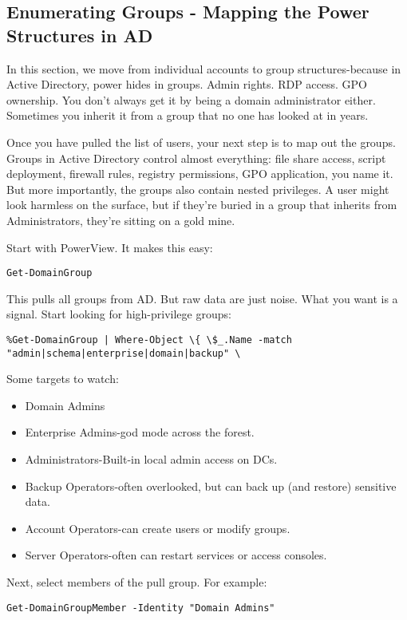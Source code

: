 \subsection{Enumerating Groups - Mapping the Power Structures in AD}

In this section, we move from individual accounts to group structures-because in Active Directory, power hides in groups. Admin rights. RDP access. GPO ownership. You don’t always get it by being a domain administrator either. Sometimes you inherit it from a group that no one has looked at in years.

Once you have pulled the list of users, your next step is to map out the groups. Groups in Active Directory control almost everything: file share access, script deployment, firewall rules, registry permissions, GPO application, you name it. But more importantly, the groups also contain nested privileges. A user might look harmless on the surface, but if they’re buried in a group that inherits from Administrators, they’re sitting on a gold mine.

Start with PowerView. It makes this easy:
\begin{verbatim}
Get-DomainGroup
\end{verbatim}
This pulls all groups from AD. But raw data are just noise. What you want is a signal. Start looking for high-privilege groups:

\begin{verbatim}
%Get-DomainGroup | Where-Object \{ \$_.Name -match "admin|schema|enterprise|domain|backup" \
\end{verbatim}

Some targets to watch:
\begin{itemize}
    \item Domain Admins
    \item Enterprise Admins-god mode across the forest.
    \item Administrators-Built-in local admin access on DCs.
    \item Backup Operators-often overlooked, but can back up (and restore) sensitive data.
    \item Account Operators-can create users or modify groups.
    \item Server Operators-often can restart services or access consoles.
\end{itemize}

Next, select members of the pull group. For example:

\begin{verbatim}
Get-DomainGroupMember -Identity "Domain Admins"
\end{verbatim}

